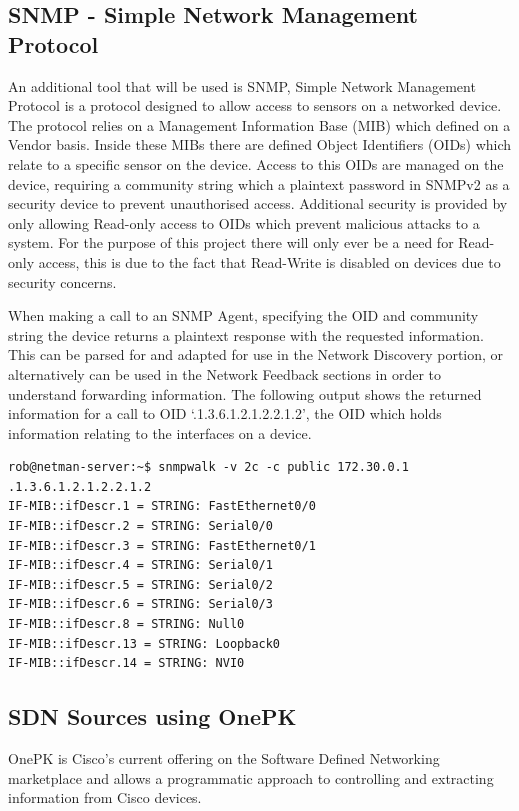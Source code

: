 \documentclass[11pt]{report}
\begin{document}
\subsection{SNMP - Simple Network Management Protocol}

An additional tool that will be used is SNMP, Simple Network Management Protocol \citep{case1989simple} is a protocol designed to allow access to sensors on a networked device. The protocol relies on a Management Information Base (MIB) which defined on a Vendor basis. Inside these MIBs there are defined Object Identifiers (OIDs) which relate to a specific sensor on the device. Access to this OIDs are managed on the device, requiring a community string which a plaintext password in SNMPv2 as a security device to prevent unauthorised access. Additional security is provided by only allowing Read-only access to OIDs which prevent malicious attacks to a system. For the purpose of this project there will only ever be a need for Read-only access, this is due to the fact that Read-Write is disabled on devices due to security concerns.

When making a call to an SNMP Agent, specifying the OID and community string the device returns a plaintext response with the requested information. This can be parsed for and adapted for use in the Network Discovery portion, or alternatively can be used in the Network Feedback sections in order to understand forwarding information. The following output shows the returned information for a call to OID `.1.3.6.1.2.1.2.2.1.2', the OID which holds information relating to the interfaces on a device.

\begin{lstlisting}
rob@netman-server:~$ snmpwalk -v 2c -c public 172.30.0.1 .1.3.6.1.2.1.2.2.1.2
IF-MIB::ifDescr.1 = STRING: FastEthernet0/0
IF-MIB::ifDescr.2 = STRING: Serial0/0
IF-MIB::ifDescr.3 = STRING: FastEthernet0/1
IF-MIB::ifDescr.4 = STRING: Serial0/1
IF-MIB::ifDescr.5 = STRING: Serial0/2
IF-MIB::ifDescr.6 = STRING: Serial0/3
IF-MIB::ifDescr.8 = STRING: Null0
IF-MIB::ifDescr.13 = STRING: Loopback0
IF-MIB::ifDescr.14 = STRING: NVI0
\end{lstlisting}

\subsection{SDN Sources using OnePK}

OnePK is Cisco's current offering on the Software Defined Networking marketplace and allows a programmatic approach to controlling and extracting information from Cisco devices.
\end{document}
